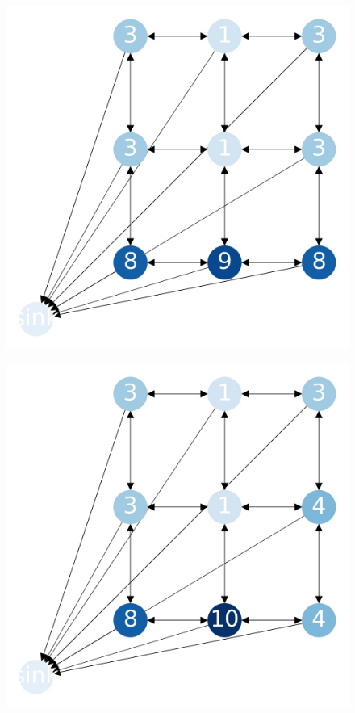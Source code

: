 \documentclass{beamer}
\begin{document}
    \begin{frame}
      \begin{figure}[h!]
        \centering
          \includegraphics[scale=0.25]{sandpile_-14}
      \end{figure}
    \end{frame}
    

    \begin{frame}
      \begin{figure}[h!]
        \centering
          \includegraphics[scale=0.25]{sandpile_-15}
      \end{figure}
    \end{frame}
    
\end{document}
